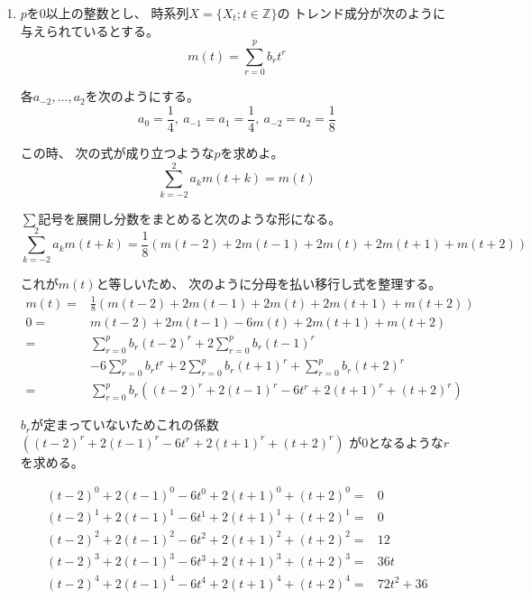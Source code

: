 \documentclass[12pt,b5paper]{ltjsarticle}
\begin{document}
\begin{enumerate}
\begin{enumerate}
\hrulefill
      \end{enumerate}

 \item
      $p$を$0$以上の整数とし、
      時系列$X=\{X_{t};t\in\mathbb{Z}\}$の
      トレンド成分が次のように与えられているとする。
      \begin{equation}
       m(t)=\sum_{r=0}^{p}b_{r}t^{r}
      \end{equation}

      各$a_{-2},\dots,a_{2}$を次のようにする。
      \begin{equation}
       a_{0}=\frac{1}{4},\
       a_{-1}=a_{1}=\frac{1}{4},\
       a_{-2}=a_{2}=\frac{1}{8}
      \end{equation}
      
      この時、
      次の式が成り立つような$p$を求めよ。
      \begin{equation}
       \sum_{k=-2}^{2}a_{k}m(t+k)=m(t)
      \end{equation}
\dotfill

      $\sum$記号を展開し分数をまとめると次のような形になる。
      \begin{equation}
       \sum_{k=-2}^{2}a_{k}m(t+k)
        =\frac{1}{8}( m(t-2)+2m(t-1)+2m(t)+2m(t+1)+m(t+2) )
      \end{equation}

      これが$m(t)$と等しいため、
      次のように分母を払い移行し式を整理する。
      \begin{align}
       m(t) =& \frac{1}{8}( m(t-2)+2m(t-1)+2m(t)+2m(t+1)+m(t+2) )\\
       0 =& m(t-2)+2m(t-1)-6m(t)+2m(t+1)+m(t+2) \\
        =& \sum_{r=0}^{p}b_{r}(t-2)^{r}+2\sum_{r=0}^{p}b_{r}(t-1)^{r}\\
       & -6\sum_{r=0}^{p}b_{r}t^{r}
       +2\sum_{r=0}^{p}b_{r}(t+1)^{r}
       +\sum_{r=0}^{p}b_{r}(t+2)^{r} \\
       =& \sum_{r=0}^{p}b_{r}( (t-2)^r +2(t-1)^r -6t^r +2(t+1)^r +(t+2)^r )
      \end{align}

      $b_{r}$が定まっていないためこれの係数
      $( (t-2)^r +2(t-1)^r -6t^r +2(t+1)^r +(t+2)^r )$
      が$0$となるような$r$を求める。


      \begin{align}
       (t-2)^0 +2(t-1)^0 -6t^0 +2(t+1)^0 +(t+2)^0
       =& 0\\
       (t-2)^1 +2(t-1)^1 -6t^1 +2(t+1)^1 +(t+2)^1
       =& 0\\
       (t-2)^2 +2(t-1)^2 -6t^2 +2(t+1)^2 +(t+2)^2
       =& 12\\
       (t-2)^3 +2(t-1)^3 -6t^3 +2(t+1)^3 +(t+2)^3
       =& 36t\\
       (t-2)^4 +2(t-1)^4 -6t^4 +2(t+1)^4 +(t+2)^4
       =& 72t^2 + 36
      \end{align}


\end{enumerate}
\end{document}
